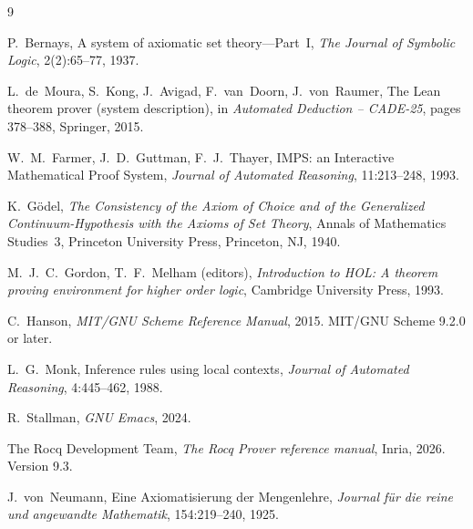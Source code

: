 \documentclass{amsbook}[openany]
\theoremstyle{definition}
\theoremstyle{remark}
\theoremstyle{remark}
\renewcommand{\[}{\par\smallskip\begin{lrbox}{\VNBdispbox}$\displaystyle}
\renewcommand{\]}{$\end{lrbox}%
    \noindent
    \ifdim\wd\VNBdispbox>\linewidth
      \resizebox{\linewidth}{!}{\usebox{\VNBdispbox}}%
    \else
      \hbox to \linewidth{\hfil\usebox{\VNBdispbox}\hfil}%
    \fi
    \par\smallskip}
\begin{document}
\begin{thebibliography}{9}

P.~Bernays,
A system of axiomatic set theory---Part~I,
\textit{The Journal of Symbolic Logic}, 2(2):65--77, 1937.

L.~de~Moura, S.~Kong, J.~Avigad, F.~van~Doorn, J.~von~Raumer,
The Lean theorem prover (system description),
in \textit{Automated Deduction -- CADE-25}, pages 378--388, Springer, 2015.

W.~M.~Farmer, J.~D.~Guttman, F.~J.~Thayer,
IMPS: an Interactive Mathematical Proof System,
\textit{Journal of Automated Reasoning}, 11:213--248, 1993.

K.~G\"odel,
\textit{The Consistency of the Axiom of Choice and of the Generalized
Continuum-Hypothesis with the Axioms of Set Theory},
Annals of Mathematics Studies~3, Princeton University Press, Princeton, NJ, 1940.

M.~J.~C.~Gordon, T.~F.~Melham (editors),
\textit{Introduction to HOL: A theorem proving environment for higher order logic},
Cambridge University Press, 1993.

C.~Hanson,
\textit{MIT/GNU Scheme Reference Manual}, 2015.  MIT/GNU Scheme 9.2.0 or later.

L.~G.~Monk,
Inference rules using local contexts,
\textit{Journal of Automated Reasoning}, 4:445--462, 1988.

R.~Stallman,
\textit{GNU Emacs}, 2024.

The Rocq Development Team,
\textit{The Rocq Prover reference manual}, Inria, 2026.  Version 9.3.

J.~von~Neumann,
Eine Axiomatisierung der Mengenlehre,
\textit{Journal f\"ur die reine und angewandte Mathematik}, 154:219--240, 1925.
\end{thebibliography}

\printindex
\end{document}
